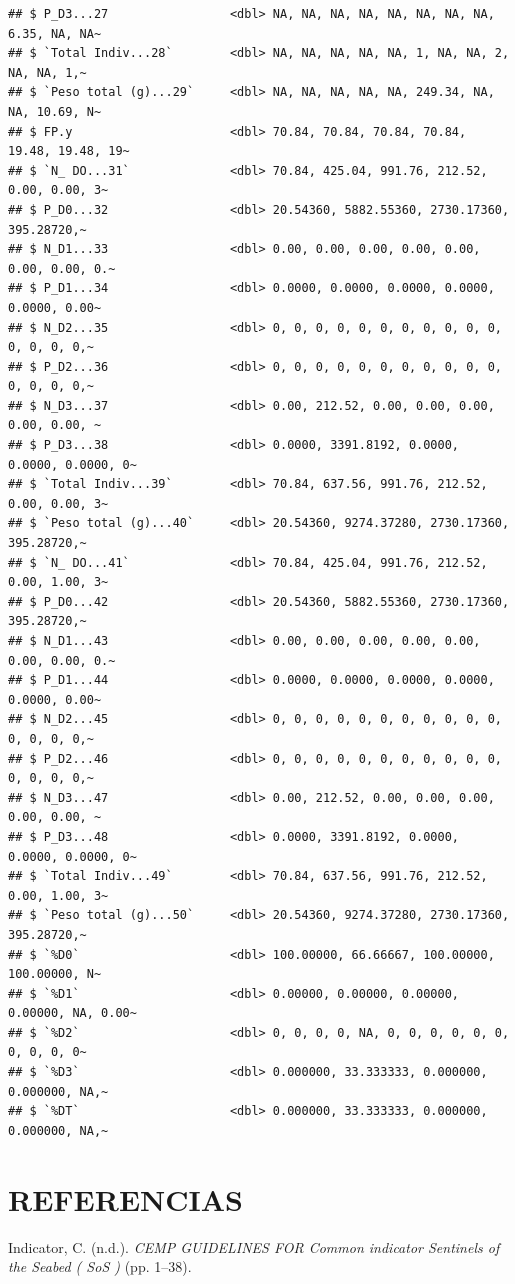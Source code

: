 \documentclass[
]{article}
\newlength{\cslhangindent}
\newlength{\cslentryspacingunit} %
\newenvironment{CSLReferences}[2] %
 {%
  \setlength{\parindent}{0pt}
  \ifodd #1
  \let\oldpar\par
  \def\par{\hangindent=\cslhangindent\oldpar}
  \fi
  \setlength{\parskip}{#2\cslentryspacingunit}
 }%
 {}
\begin{document}
\begin{verbatim}
## $ P_D3...27                 <dbl> NA, NA, NA, NA, NA, NA, NA, NA, 6.35, NA, NA~
## $ `Total Indiv...28`        <dbl> NA, NA, NA, NA, NA, 1, NA, NA, 2, NA, NA, 1,~
## $ `Peso total (g)...29`     <dbl> NA, NA, NA, NA, NA, 249.34, NA, NA, 10.69, N~
## $ FP.y                      <dbl> 70.84, 70.84, 70.84, 70.84, 19.48, 19.48, 19~
## $ `N_ DO...31`              <dbl> 70.84, 425.04, 991.76, 212.52, 0.00, 0.00, 3~
## $ P_D0...32                 <dbl> 20.54360, 5882.55360, 2730.17360, 395.28720,~
## $ N_D1...33                 <dbl> 0.00, 0.00, 0.00, 0.00, 0.00, 0.00, 0.00, 0.~
## $ P_D1...34                 <dbl> 0.0000, 0.0000, 0.0000, 0.0000, 0.0000, 0.00~
## $ N_D2...35                 <dbl> 0, 0, 0, 0, 0, 0, 0, 0, 0, 0, 0, 0, 0, 0, 0,~
## $ P_D2...36                 <dbl> 0, 0, 0, 0, 0, 0, 0, 0, 0, 0, 0, 0, 0, 0, 0,~
## $ N_D3...37                 <dbl> 0.00, 212.52, 0.00, 0.00, 0.00, 0.00, 0.00, ~
## $ P_D3...38                 <dbl> 0.0000, 3391.8192, 0.0000, 0.0000, 0.0000, 0~
## $ `Total Indiv...39`        <dbl> 70.84, 637.56, 991.76, 212.52, 0.00, 0.00, 3~
## $ `Peso total (g)...40`     <dbl> 20.54360, 9274.37280, 2730.17360, 395.28720,~
## $ `N_ DO...41`              <dbl> 70.84, 425.04, 991.76, 212.52, 0.00, 1.00, 3~
## $ P_D0...42                 <dbl> 20.54360, 5882.55360, 2730.17360, 395.28720,~
## $ N_D1...43                 <dbl> 0.00, 0.00, 0.00, 0.00, 0.00, 0.00, 0.00, 0.~
## $ P_D1...44                 <dbl> 0.0000, 0.0000, 0.0000, 0.0000, 0.0000, 0.00~
## $ N_D2...45                 <dbl> 0, 0, 0, 0, 0, 0, 0, 0, 0, 0, 0, 0, 0, 0, 0,~
## $ P_D2...46                 <dbl> 0, 0, 0, 0, 0, 0, 0, 0, 0, 0, 0, 0, 0, 0, 0,~
## $ N_D3...47                 <dbl> 0.00, 212.52, 0.00, 0.00, 0.00, 0.00, 0.00, ~
## $ P_D3...48                 <dbl> 0.0000, 3391.8192, 0.0000, 0.0000, 0.0000, 0~
## $ `Total Indiv...49`        <dbl> 70.84, 637.56, 991.76, 212.52, 0.00, 1.00, 3~
## $ `Peso total (g)...50`     <dbl> 20.54360, 9274.37280, 2730.17360, 395.28720,~
## $ `%D0`                     <dbl> 100.00000, 66.66667, 100.00000, 100.00000, N~
## $ `%D1`                     <dbl> 0.00000, 0.00000, 0.00000, 0.00000, NA, 0.00~
## $ `%D2`                     <dbl> 0, 0, 0, 0, NA, 0, 0, 0, 0, 0, 0, 0, 0, 0, 0~
## $ `%D3`                     <dbl> 0.000000, 33.333333, 0.000000, 0.000000, NA,~
## $ `%DT`                     <dbl> 0.000000, 33.333333, 0.000000, 0.000000, NA,~
\end{verbatim}

\newpage

\hypertarget{referencias}{%
\section*{REFERENCIAS}\label{referencias}}

\hypertarget{refs}{}
\begin{CSLReferences}{1}{0}
\leavevmode{}%
Indicator, C. (n.d.). \emph{{CEMP GUIDELINES FOR Common indicator Sentinels of the Seabed ( SoS )}} (pp. 1--38).

\end{CSLReferences}
\end{document}
